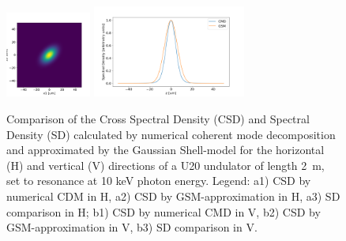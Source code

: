 \documentclass{iopconfser}
\begin{document}
\begin{figure}[H]
    \includegraphics[width=0.25\textwidth]{figures/GSM_V.png}
    \includegraphics[width=0.45\textwidth]{figures/SD_V.png}

        
    \caption{Comparison of the Cross Spectral Density (CSD) and Spectral Density (SD) calculated by numerical coherent mode decomposition and approximated by the Gaussian Shell-model for the horizontal (H) and vertical (V) directions of a U20 undulator of length \SI{2}{\meter},  set to resonance at 10 keV photon energy.
    Legend:
    a1) CSD by numerical CDM in H,
    a2) CSD by GSM-approximation in H,
    a3) SD comparison in H;
    b1) CSD by numerical CMD in V,
    b2) CSD by GSM-approximation in V,
    b3) SD comparison in V.
    }
    \label{fig:GSMvsUND}
\end{figure}
\end{document}
